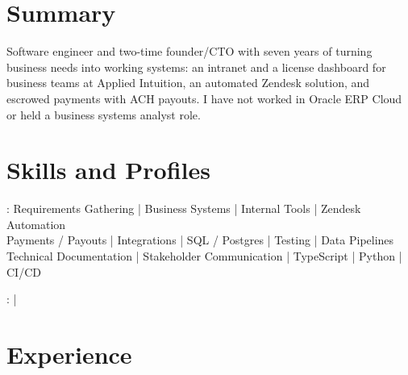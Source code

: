 \documentclass[print]{jack-resume}
\begin{document}
\pagecolor{darkmodeBackground}


\begin{minipage}[t][1cm][t]{.03\textwidth}
    \hfill
\end{minipage}

\section{Summary}
Software engineer and two-time founder/CTO with seven years of turning business needs into working systems: an intranet and a license dashboard for business teams at Applied Intuition, an automated Zendesk solution, and escrowed payments with ACH payouts. I have not worked in Oracle ERP Cloud or held a business systems analyst role.
\sectionsep

\section{Skills and Profiles}
:
Requirements Gathering \hfill | \hfill
Business Systems \hfill | \hfill
Internal Tools \hfill | \hfill
Zendesk Automation \\
\hspace{1.0cm} Payments / Payouts \hfill | \hfill
Integrations \hfill | \hfill
SQL / Postgres \hfill | \hfill
Testing \hfill | \hfill
Data Pipelines \\
\hspace{1.0cm} Technical Documentation \hfill | \hfill
Stakeholder Communication \hfill | \hfill
TypeScript \hfill | \hfill
Python \hfill | \hfill
CI/CD \\

\raggedright{
    :
      \href{https://www.linkedin.com/in/jack-sturtevant/}{ \ExternalLink} |
     \href{https://github.com/jacksturt}{ \ExternalLink}}

\section{Experience}
\end{document}
